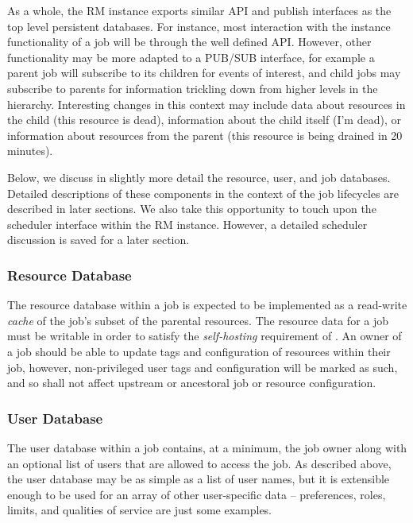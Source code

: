 As a whole, the RM instance exports similar API and publish interfaces
as the top level persistent databases. For instance, most interaction
with the instance functionality of a job will be through the well
defined API. However, other functionality may be more adapted to
a PUB/SUB interface, for example a parent job will subscribe
to its children for events of interest, and child jobs may subscribe
to parents for information trickling down from higher levels in the
hierarchy. Interesting changes in this context may include data
about resources in the child (this resource is dead), information about
the child itself (I'm dead), or information about resources from
the parent (this resource is being drained in 20 minutes).
\ifcomments
{}
\fi

Below, we discuss in slightly more detail the resource, user, and
job databases. Detailed descriptions of these components in the
context of the job lifecycles are described in later sections.
We also take this opportunity to touch upon the
scheduler interface within the RM instance. However, a detailed
scheduler discussion is saved for a later section.

\subsubsection{Resource Database}

The resource database within a job is expected to be implemented as
a read-write \emph{cache} of the job's subset of the parental resources.
The resource data for a job must be writable in order to satisfy
the \emph{self-hosting} requirement of \ngrm. An owner of a job
should be able to update tags and configuration of resources within
their job, however, non-privileged user tags and configuration will
be marked as such, and so shall not affect upstream or ancestoral
job or resource configuration.

\subsubsection{User Database}

The user database within a job contains, at a minimum, the job
owner along with an optional list of users that are allowed to
access the job. As described above, the user database may be
as simple as a list of user names, but it is extensible enough
to be used for an array of other user-specific data -- preferences,
roles, limits, and qualities of service are just some examples.

